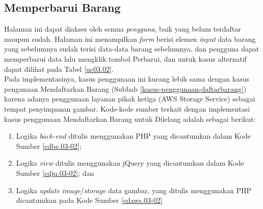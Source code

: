 \subsection{Memperbarui Barang}
Halaman ini dapat diakses oleh semua \textit{pengguna}, baik yang belum terdaftar maupun sudah. Halaman ini menampilkan \textit{form} berisi elemen \textit{input} data barang yang sebelumnya sudah terisi data-data barang sebelumnya, dan pengguna dapat memperbarui data lalu mengklik tombol Perbarui, dan untuk kasus alternatif dapat dilihat pada Tabel \ref{uc03.02}.\\
\indent Pada implementasinya, kasus penggunaan ini kurang lebih sama dengan kasus pengunaan Mendaftarkan Barang (Subbab \ref{kasus-penggunaan-daftarbarang}) karena adanya penggunaan layanan pihak ketiga (AWS Storage Service) sebagai tempat penyimpanan gambar. Kode-kode sumber terkait dengan implementasi kasus penggunaan Mendaftarkan Barang untuk Dilelang adalah sebagai berikut:
\begin{enumerate}
	\item Logika \textit{back-end} ditulis menggunakan PHP yang dicantumkan dalam Kode Sumber \ref{cdbe.03-02}; 
	\item Logika \textit{view} ditulis menggunakan jQuery yang dicantumkan dalam Kode Sumber \ref{cdjq.03-02}; dan
	\item Logika \textit{update image}/\textit{storage} data gambar, yang ditulis menggunakan PHP dicantumkan pada Kode Sumber \ref{cdaws.03-02}
\end{enumerate} 

